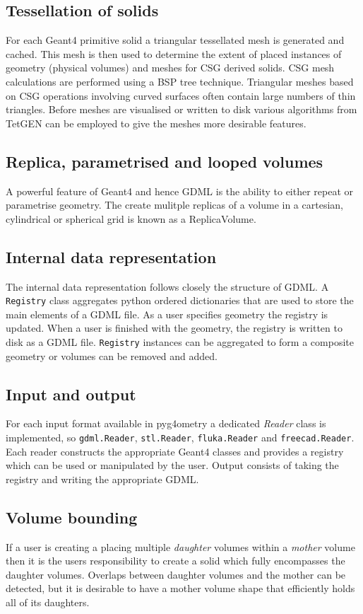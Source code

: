 \documentclass[final,5p,times,twocolumn]{elsarticle}
\begin{document}
\subsection{Tessellation of solids}
For each Geant4 primitive solid a triangular tessellated mesh is generated and cached. This mesh is then used to determine the extent of placed instances of 
geometry (physical volumes) and meshes for CSG derived solids. CSG mesh calculations are performed using a BSP tree technique. Triangular meshes based
on CSG operations involving curved surfaces often contain large numbers of thin triangles. Before meshes are visualised or written to disk various algorithms from 
TetGEN can be employed to give the meshes more desirable features. 

\subsection{Replica, parametrised and looped volumes}
A powerful feature of Geant4 and hence GDML is the ability to either repeat or parametrise geometry. The create mulitple replicas of a volume in a cartesian, cylindrical or 
spherical grid is known as a ReplicaVolume.  

\subsection{Internal data representation} 
The internal data representation follows closely the structure of GDML. A \verb|Registry| class aggregates python ordered dictionaries that are  used to store the main 
elements of a GDML file. As a user specifies geometry the registry is updated. When a user is finished with the geometry, the registry is written to disk as a GDML file.
\verb|Registry| instances can be aggregated to form a composite geometry or volumes can be removed and added.   
  
\subsection{Input and output} 
For each input format available in pyg4ometry a dedicated {\it Reader} class is implemented, so \verb|gdml.Reader|, \verb|stl.Reader|, \verb|fluka.Reader| 
and \verb|freecad.Reader|. Each reader constructs the appropriate Geant4 classes and provides a registry which can be used or manipulated by the user. 
Output consists of taking the registry and writing the appropriate GDML.

 \subsection{Volume bounding} 
If a user is creating a placing multiple {\em daughter} volumes within a {\em mother} volume then it is the users responsibility to create a solid which fully encompasses the 
daughter volumes. Overlaps between daughter volumes and the mother can be detected, but it is desirable to have a mother volume shape that efficiently holds all of its daughters. 
 
\end{document}
